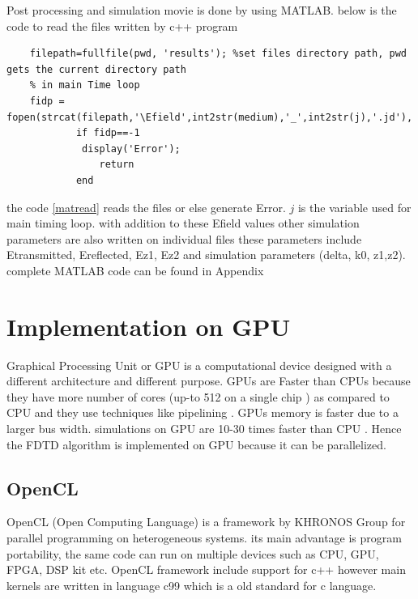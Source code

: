 Post processing and simulation movie is done by using MATLAB. below is the code to read the files written by c++ program
\begin{lstlisting}
	filepath=fullfile(pwd, 'results'); %set files directory path, pwd gets the current directory path
	% in main Time loop
	fidp = fopen(strcat(filepath,'\Efield',int2str(medium),'_',int2str(j),'.jd'),'r','l');
	        if fidp==-1
           	 display('Error');
       	        return
        	end
\end{lstlisting}
the code \ref{matread}  reads the files or else generate Error. $j$ is the variable used for main timing loop. with addition to these Efield values other simulation parameters are also written on individual files these parameters include Etransmitted, Ereflected, Ez1, Ez2 and simulation parameters (delta, k0, z1,z2). complete MATLAB code can be found in Appendix %
\clearpage
\section{Implementation on GPU }
Graphical Processing Unit or GPU is a computational device designed with a different architecture and different purpose. GPUs are Faster than CPUs because they have more number of cores (up-to 512 on a single chip \cite{cpuvsgpunotes}
) as compared to CPU and they use techniques like pipelining \cite{ref:gpu2}. GPUs memory is faster due to a larger bus width. simulations on GPU are 10-30 times faster than CPU \cite{Ref:gpuvscpui}
. Hence the FDTD algorithm is implemented on GPU because it can be parallelized.

\subsection{OpenCL}
OpenCL (Open Computing Language) is a framework by KHRONOS Group %
for parallel programming on heterogeneous systems. its main advantage is program portability, the same code can run on multiple devices such as CPU, GPU, FPGA, DSP kit \cite{ref:devices}
 etc. OpenCL framework include support for c++ however main kernels are written in language c99 which is a old standard for c language.
